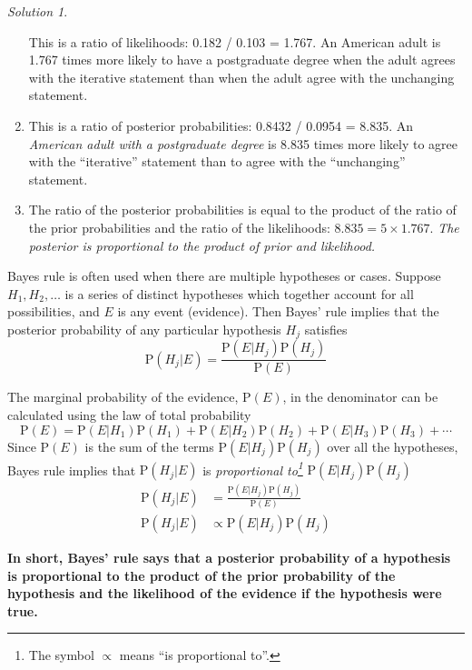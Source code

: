 \documentclass[
  letterpaper,
  DIV=11,
  numbers=noendperiod]{scrreprt}
\theoremstyle{plain}
\theoremstyle{definition}
\theoremstyle{definition}
\theoremstyle{definition}
\theoremstyle{remark}
\newtheorem{refsolution}{Solution}[chapter]
\begin{document}
\begin{tcolorbox}
\begin{refsolution}
\begin{enumerate}
  This is a ratio of likelihoods: 0.182 / 0.103 = 1.767. An American
  adult is 1.767 times more likely to have a postgraduate degree when
  the adult agrees with the iterative statement than when the adult
  agree with the unchanging statement.
\item
  This is a ratio of posterior probabilities: 0.8432 / 0.0954 = 8.835.
  An \emph{American adult with a postgraduate degree} is 8.835 times
  more likely to agree with the ``iterative'' statement than to agree
  with the ``unchanging'' statement.
\item
  The ratio of the posterior probabilities is equal to the product of
  the ratio of the prior probabilities and the ratio of the likelihoods:
  \(8.835 = 5 \times 1.767\). \emph{The posterior is proportional to the
  product of prior and likelihood.}
\end{enumerate}

\label{sol-bayes-rule-iterative-bayestable}

\end{refsolution}

\end{tcolorbox}

Bayes rule is often used when there are multiple hypotheses or cases.
Suppose \(H_1,H_2, \ldots\) is a series of distinct hypotheses which
together account for all possibilities, and \(E\) is any event
(evidence). Then Bayes' rule implies that the posterior probability of
any particular hypothesis \(H_j\) satisfies \[
\textrm{P}(H_j |E) = \frac{\textrm{P}(E|H_j)\textrm{P}(H_j)}{\textrm{P}(E)}
\]

The marginal probability of the evidence, \(\textrm{P}(E)\), in the
denominator can be calculated using the law of total probability \[
\textrm{P}(E) = \textrm{P}(E|H_1) \textrm{P}(H_1) + \textrm{P}(E|H_2) \textrm{P}(H_2) + \textrm{P}(E|H_3) \textrm{P}(H_3) + \cdots
\] Since \(\textrm{P}(E)\) is the sum of the terms
\(\textrm{P}(E|H_j)\textrm{P}(H_j)\) over all the hypotheses, Bayes rule
implies that \(\textrm{P}(H_j |E)\) is \emph{proportional to\footnote{The
  symbol \(\propto\) means ``is proportional to''.}}
\(\textrm{P}(E|H_j)\textrm{P}(H_j)\) \begin{align*}
\textrm{P}(H_j |E) & = \frac{\textrm{P}(E|H_j)\textrm{P}(H_j)}{\textrm{P}(E)}\\
\textrm{P}(H_j |E) & \propto \textrm{P}(E|H_j)\textrm{P}(H_j)
\end{align*}

\textbf{In short, Bayes' rule says that a posterior probability of a
hypothesis is proportional to the product of the prior probability of
the hypothesis and the likelihood of the evidence if the hypothesis were
true.}
\end{document}
